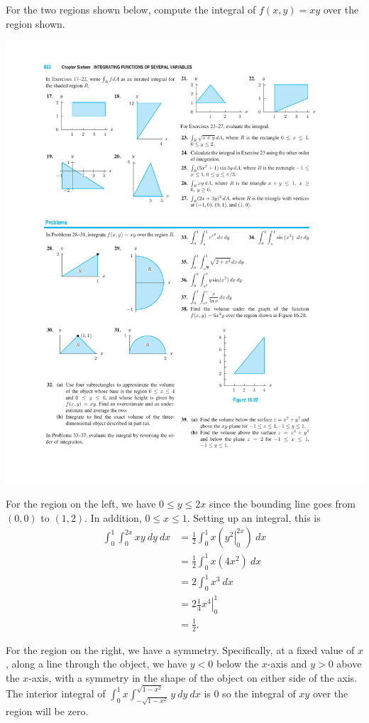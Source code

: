 \documentclass[12pt,letterpaper,noanswers]{exam}
\begin{document}
\begin{questions}
\begin{parts}
\item For the two regions shown below, compute the integral of $f(x,y) = xy$ over the region shown.

\includegraphics{img/HW06p1.pdf}

\begin{solution}
For the region on the left, we have $0\leq y\leq 2x$ since the bounding line goes from $(0,0)$ to $(1,2)$.  In addition, $0\leq x\leq 1$.  Setting up an integral, this is \begin{align*}
\int_0^1\int_0^{2x} xy\ dy\ dx &= \frac{1}{2}\int_0^1 x\left(\left.y^2\right\vert_0^{2x}\right)\ dx\\
&= \frac{1}{2}\int_0^1 x(4x^2)\ dx\\
&=2\int_0^1 x^3\ dx\\
&=2\frac{1}{4}\left.x^4\right\vert_0^1 \\
&= \frac{1}{2}.
\end{align*}

For the region on the right, we have a symmetry.  Specifically, at a fixed value of $x$, along a line through the object, we have $y<0$ below the $x$-axis and $y>0$ above the $x$-axis, with a symmetry in the shape of the object on either side of the axis.  The interior integral of $\int_0^1x\int_{-\sqrt{1-x^2}}^{\sqrt{1-x^2}} y\ dy\ dx$ is $0$ so the integral of $xy$ over the region will be zero.
\end{solution}


\end{parts}
\end{questions}
\end{document}
